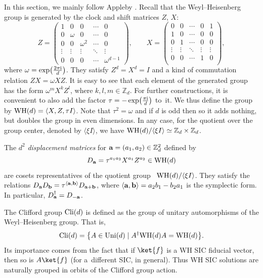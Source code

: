 \documentclass[pdftex]{sigma}
\numberwithin{equation}{section}
\newcommand{\la}{\langle}
\newcommand{\ra}{\rangle}
\newcommand{\mbb}{\mathbb}
\newcommand{\bmp}{\begin{pmatrix}}
\newcommand{\emp}{\end{pmatrix}}
\begin{document}
In this section, we mainly follow Appleby \cite{Appleby}.
Recall that the Weyl--Heisenberg group is generated by
the clock and shift matrices $Z$, $X$:
\[
Z = \bmp
1 & 0 & 0 & \cdots & 0\\
0 & \omega & 0 & \cdots & 0\\
0 & 0 & \omega^2 & \cdots & 0\\
\vdots & \vdots & \vdots & \ddots & \vdots\\
0 & 0 & 0 & \cdots & \omega^{d-1}
\emp,
\qquad
X = \bmp
0 & 0 & \cdots & 0 & 1\\
1 & 0 & \cdots & 0 & 0\\
0 & 1 & \cdots & 0 & 0\\
\vdots & \vdots & \ddots &\vdots &\vdots\\
0 & 0 & \cdots & 1 & 0\\
\emp,
\]
where $\omega = \exp \bigl(\frac{2\pi{\rm i}}{d}\bigr)$.
They satisfy $Z^d = X^d = I$ and a kind of commutation relation $ZX = \omega XZ$.
It is easy to see that each element of the generated group has the
form $\omega^mX^kZ^l$, where $k,l,m \in \mbb{Z}_d$.
For further constructions, it is convenient to also add the factor $\tau = -\exp \bigl(\frac{\pi {\rm i}}{d}\bigr)$ to~it.
We thus define the group by ${\rm WH}(d) = \la X, Z, \tau I \ra$.
Note that $\tau^2 = \omega$ and if $d$ is odd then 
so it adds nothing, but doubles the group in even dimensions.
In any case, for the quotient over the group center, denoted by $\la \xi I \ra$, we have ${\rm WH}(d) / \la \xi I \ra \simeq \mbb{Z}_d \times \mbb{Z}_d$.

The $d^2$ \textit{displacement matrices} for ${\bf a} = (a_1,a_2) \in \mbb{Z}_d^2$ defined by
\[
D_{\bf a} = \tau^{a_1a_2} X^{a_1}Z^{a_2} \in {\rm WH}(d)
\]
are cosets representatives of the quotient group ~${{\rm WH}(d) / \la \xi I \ra}$.
They satisfy the relations $D_{\bf a} D_{\bf b} = \tau^{\la \bf a, b\ra} D_{\bf a+b}$,
where $\la {\bf a, b} \ra = a_2b_1 - b_2a_1$ is the symplectic form.
In particular, $D_{\bf a}^\dag = D_{-\bf a}$.

The Clifford group ${\rm Cli}(d)$ is defined as the group of unitary automorphisms
of the Weyl--Heisenberg group. That is,
\[
{\rm Cli}(d) = \bigl\{ A \in {\rm Uni}(d) \mid A^\dag {\rm WH}(d) A = {\rm WH}(d) \bigr\}.
\]
Its importance comes from the fact that if $\ket{f}$ is a WH SIC fiducial vector,
then so is $A\ket{f}$ (for a~different SIC, in general).
Thus WH SIC solutions are naturally grouped in orbits of the Clifford group action.
\end{document}
